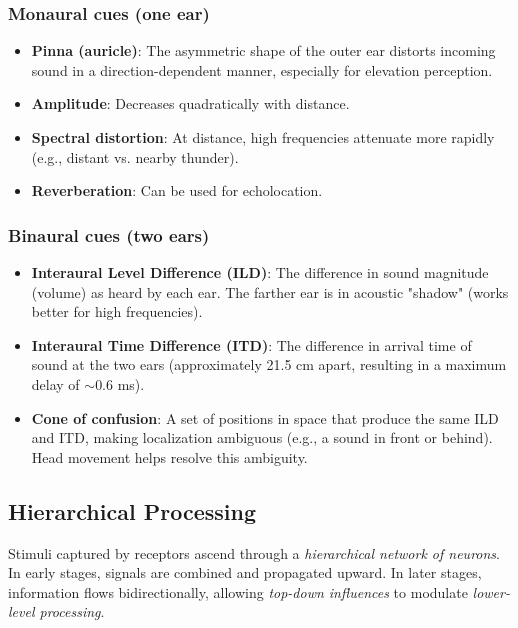 \documentclass[11pt,a4paper]{article}
\theoremstyle{definition}
\theoremstyle{plain}
\theoremstyle{remark}
\begin{document}
\subsubsection{Monaural cues (one ear)}
\begin{itemize}
    \item \textbf{Pinna (auricle)}: The asymmetric shape of the outer ear distorts incoming sound in a direction-dependent manner, especially for elevation perception.
    
    \item \textbf{Amplitude}: Decreases quadratically with distance.
    
    \item \textbf{Spectral distortion}: At distance, high frequencies attenuate more rapidly (e.g., distant vs. nearby thunder).
    
    \item \textbf{Reverberation}: Can be used for echolocation.
\end{itemize}

\subsubsection{Binaural cues (two ears)}
\begin{itemize}
    \item \textbf{Interaural Level Difference (ILD)}: The difference in sound magnitude (volume) as heard by each ear. The farther ear is in acoustic "shadow" (works better for high frequencies).
    
    \item \textbf{Interaural Time Difference (ITD)}: The difference in arrival time of sound at the two ears (approximately 21.5 cm apart, resulting in a maximum delay of $\sim$0.6 ms).
    
    \item \textbf{Cone of confusion}: A set of positions in space that produce the same ILD and ITD, making localization ambiguous (e.g., a sound in front or behind). Head movement helps resolve this ambiguity.
\end{itemize}

\subsection{Hierarchical Processing}

Stimuli captured by receptors ascend through a \textit{hierarchical network of neurons}. In early stages, signals are combined and propagated upward. In later stages, information flows bidirectionally, allowing \textit{top-down influences} to modulate \textit{lower-level processing}.
\end{document}
